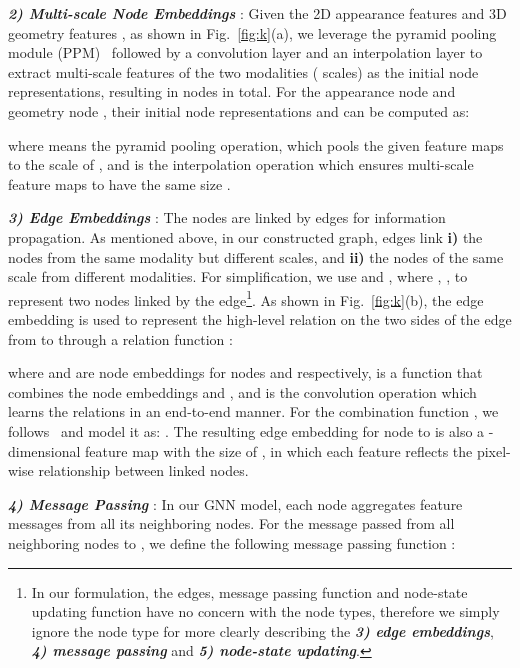 \documentclass[runningheads]{llncs}
\begin{document}
	\noindent \emph{\textbf{\footnotesize 2) Multi-scale Node Embeddings }}: Given the 2D appearance features  and 3D geometry features , as shown in Fig.~\ref{fig:k}(a), we leverage the pyramid pooling module (PPM)~\cite{zhao2017pyramid} followed by a convolution layer and an interpolation layer to extract multi-scale features of the two modalities ( scales) as the initial node representations, resulting in  nodes in total. For the appearance node  and geometry node , their initial node representations  and  can be computed as:


\noindent where  means the pyramid pooling operation, which pools the given feature maps to the scale of , and  is the interpolation operation which ensures multi-scale feature maps to have the same size . 

\setcounter{footnote}{0}
	\noindent \emph{\textbf{\footnotesize 3) Edge Embeddings }}: The nodes are linked by edges for information propagation. As mentioned above, in our constructed graph, edges link  {\bfseries \small i)} the nodes from the same modality but different scales, and {\bfseries \small ii)} the nodes of the same scale from different modalities. For simplification, we use  and , where , , to represent two nodes linked by the edge\footnote{In our formulation, the edges, message passing function and node-state updating function have no concern with the node types, therefore we simply ignore the node type for more clearly describing the \emph{\textbf{3) edge embeddings}}, \emph{\textbf{4) message passing}} and \emph{\textbf{5) node-state updating}}.}. As shown in Fig.~\ref{fig:k}(b), the edge embedding  is used to represent the high-level relation on the two sides of the edge from  to  through a relation function :




\noindent where  and  are node embeddings for nodes  and  respectively,  is a function that combines the node embeddings  and , and  is the convolution operation which learns the relations in an end-to-end manner. For the combination function , we follows~\cite{wang2019dynamic} and model it as: . The resulting edge embedding  for node  to  is also a -dimensional feature map with the size of , in which each feature reflects the pixel-wise relationship between linked nodes. 

\noindent \emph{\textbf{\footnotesize 4) Message Passing }}:
In our GNN model, each node aggregates feature messages from all its neighboring nodes. For the message  passed from all neighboring nodes  to , we define the following message passing function :
\end{document}
